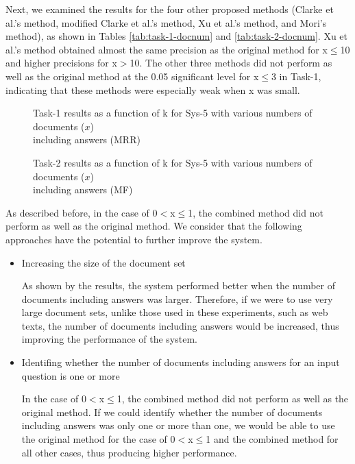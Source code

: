 Next, we examined the results for the four other proposed methods (Clarke et al.'s method, modified Clarke et al.'s method, 
Xu et al.'s method, and Mori's method), as shown in Tables \ref{tab:task-1-docnum} and \ref{tab:task-2-docnum}. 
Xu et al.'s method obtained almost the same precision as the original method for x$\leq$10 and 
higher precisions for x$>$10. 
The other three methods 
did not perform as well as the original method 
at the 0.05 significant level for x$\leq$3 in Task-1, 
indicating that these methods were especially weak 
when x was small. 

\begin{figure}[p]
      \begin{center}
      \end{center}
      \caption{Task-1 results as a function of k for Sys-5 with various numbers of documents ($x$)\\ including answers (MRR)}
    \label{fig:task-1_results-docnum}
\end{figure}

\begin{figure}[p]
      \begin{center}
      \end{center}
      \caption{Task-2 results as a function of k for Sys-5 with various numbers of documents ($x$)\\ including answers (MF)}
      \label{fig:task-2_results-docnum}
\end{figure}

\clearpage

As described before, in the case of 0$<$x$\leq$1, 
the combined method did not perform as well as the original method.
We consider that the following approaches have the potential to 
further improve the system.
\begin{itemize}
\item 
  Increasing the size of the document set
  
  As shown by the results, the system performed better
  when the number of documents including answers was larger. 
  Therefore, if we were to use 
  very large document sets, unlike those used in these experiments, 
  such as web texts, 
  the number of documents including answers would be increased,
  thus improving the performance of the system.

\item 
  Identifing whether 
  the number of documents including answers 
  for an input question is 
  one or more
  
  In the case of 0$<$x$\leq$1, 
  the combined method did not perform as well as the original method. 
  If we could identify whether 
  the number of documents including answers was only one or more than one, 
  we would be able to use the original method for the case of 0$<$x$\leq$1 
  and the combined method for all other cases, 
  thus producing higher performance. 
  
\end{itemize}

